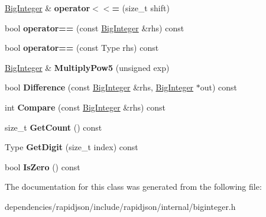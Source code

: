 \begin{DoxyCompactItemize}
\item 
\mbox{\label{classinternal_1_1_big_integer_a48b12ef4676f19290dfd5816a4ef4a88}} 
\hyperlink{classinternal_1_1_big_integer}{Big\+Integer} \& {\bfseries operator$<$$<$=} (size\+\_\+t shift)
\item 
\mbox{\label{classinternal_1_1_big_integer_a52b424669238bdebc134e793d3b470ae}} 
bool {\bfseries operator==} (const \hyperlink{classinternal_1_1_big_integer}{Big\+Integer} \&rhs) const
\item 
\mbox{\label{classinternal_1_1_big_integer_a8b6ab0d652d461c1136e0388d352628b}} 
bool {\bfseries operator==} (const Type rhs) const
\item 
\mbox{\label{classinternal_1_1_big_integer_a98a13f169c27d1acfa57054f37c61763}} 
\hyperlink{classinternal_1_1_big_integer}{Big\+Integer} \& {\bfseries Multiply\+Pow5} (unsigned exp)
\item 
\mbox{\label{classinternal_1_1_big_integer_ad7ad62e6b62af38283ee940eb4015b26}} 
bool {\bfseries Difference} (const \hyperlink{classinternal_1_1_big_integer}{Big\+Integer} \&rhs, \hyperlink{classinternal_1_1_big_integer}{Big\+Integer} $\ast$out) const
\item 
\mbox{\label{classinternal_1_1_big_integer_af8e90fff5382de6c1cda5f751017200c}} 
int {\bfseries Compare} (const \hyperlink{classinternal_1_1_big_integer}{Big\+Integer} \&rhs) const
\item 
\mbox{\label{classinternal_1_1_big_integer_aa0ad6e74839b7c7fe77c9742ec079525}} 
size\+\_\+t {\bfseries Get\+Count} () const
\item 
\mbox{\label{classinternal_1_1_big_integer_a7288eefd49735c3c3edec698f56738bd}} 
Type {\bfseries Get\+Digit} (size\+\_\+t index) const
\item 
\mbox{\label{classinternal_1_1_big_integer_ae12dd6759f1f76501db3d1bcafce39cd}} 
bool {\bfseries Is\+Zero} () const
\end{DoxyCompactItemize}


The documentation for this class was generated from the following file\+:\begin{DoxyCompactItemize}
\item 
dependencies/rapidjson/include/rapidjson/internal/biginteger.\+h\end{DoxyCompactItemize}
